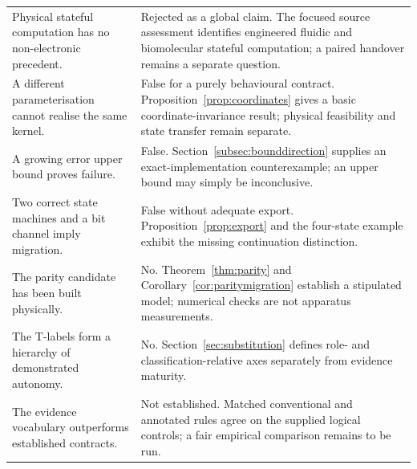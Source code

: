 \begin{longtable}{@{}>{\raggedright\arraybackslash}p{}>{\raggedright\arraybackslash}p{}@{}}
Physical stateful computation has no non-electronic precedent. & Rejected as a global claim. The focused source assessment identifies engineered fluidic and biomolecular stateful computation; a paired handover remains a separate question.\\
A different parameterisation cannot realise the same kernel. & False for a purely behavioural contract. Proposition~\ref{prop:coordinates} gives a basic coordinate-invariance result; physical feasibility and state transfer remain separate.\\
A growing error upper bound proves failure. & False. Section~\ref{subsec:bounddirection} supplies an exact-implementation counterexample; an upper bound may simply be inconclusive.\\
Two correct state machines and a bit channel imply migration. & False without adequate export. Proposition~\ref{prop:export} and the four-state example exhibit the missing continuation distinction.\\
The parity candidate has been built physically. & No. Theorem~\ref{thm:parity} and Corollary~\ref{cor:paritymigration} establish a stipulated model; numerical checks are not apparatus measurements.\\
The T-labels form a hierarchy of demonstrated autonomy. & No. Section~\ref{sec:substitution} defines role- and classification-relative axes separately from evidence maturity.\\
The evidence vocabulary outperforms established contracts. & Not established. Matched conventional and annotated rules agree on the supplied logical controls; a fair empirical comparison remains to be run.\\
\bottomrule
\end{longtable}
\endgroup
